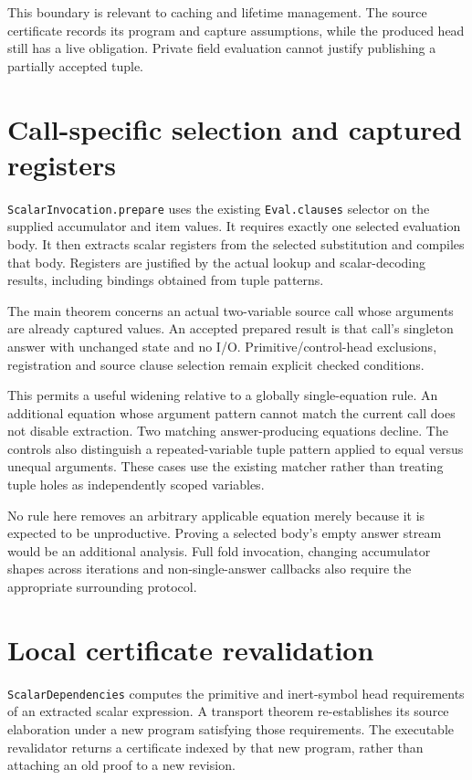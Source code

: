 \documentclass[11pt,a4paper]{article}
\newcommand{\code}[1]{\nolinkurl{#1}}
\begin{document}
This boundary is relevant to caching and lifetime management. The source
certificate records its program and capture assumptions, while the produced
head still has a live obligation. Private field evaluation cannot justify
publishing a partially accepted tuple.

\section{Call-specific selection and captured registers}

\code{ScalarInvocation.prepare} uses the existing \code{Eval.clauses}
selector on the supplied accumulator and item values. It requires exactly
one selected evaluation body. It then extracts scalar registers from the
selected substitution and compiles that body. Registers are justified by the
actual lookup and scalar-decoding results, including bindings obtained from
tuple patterns.

The main theorem concerns an actual two-variable source call whose arguments
are already captured values. An accepted prepared result is that call's
singleton answer with unchanged state and no I/O. Primitive/control-head
exclusions, registration and source clause selection remain explicit checked
conditions.

This permits a useful widening relative to a globally single-equation rule.
An additional equation whose argument pattern cannot match the current call
does not disable extraction. Two matching answer-producing equations decline.
The controls also distinguish a repeated-variable tuple pattern applied to
equal versus unequal arguments. These cases use the existing matcher rather
than treating tuple holes as independently scoped variables.

No rule here removes an arbitrary applicable equation merely because it is
expected to be unproductive. Proving a selected body's empty answer stream
would be an additional analysis. Full fold invocation, changing accumulator
shapes across iterations and non-single-answer callbacks also require the
appropriate surrounding protocol.

\section{Local certificate revalidation}

\code{ScalarDependencies} computes the primitive and inert-symbol head
requirements of an extracted scalar expression. A transport theorem
re-establishes its source elaboration under a new program satisfying those
requirements. The executable revalidator returns a certificate indexed by
that new program, rather than attaching an old proof to a new revision.
\end{document}
